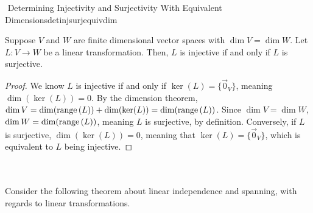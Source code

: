         \begin{theorem}{\Stop\,\,Determining Injectivity and Surjectivity With Equivalent Dimensions}{detinjsurjequivdim}
            
            Suppose \(V\) and \(W\) are finite dimensional vector spaces with \(\dim V=\dim W\). Let \(L:V\to W\) be a linear transformation. Then, \(L\) is injective if and only if \(L\) is surjective.
            \begin{proof}
                We know \(L\) is injective if and only if \(\ker(L)=\{\vec{0}_V\}\), meaning \(\dim (\ker(L))=0\). By the dimension theorem, \(\dim V=\dim(\text{range\,}(L))+\dim(\ker(L))=\dim(\text{range\,}(L))\). Since \(\dim V=\dim W\), \(\dim W=\dim(\text{range\,}(L))\), meaning \(L\) is surjective, by definition. Conversely, if \(L\) is surjective, \(\dim(\ker(L))=0\), meaning that \(\ker(L)=\{\vec{0}_V\}\), which is equivalent to \(L\) being injective.
            \end{proof}

        \end{theorem}
        \pagebreak
        \vphantom
        \\
        \\
        Consider the following theorem about linear independence and spanning, with regards to linear transformations.
